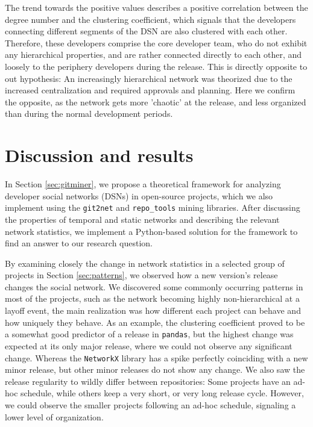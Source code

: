 The trend towards the positive values describes a positive correlation between the degree number and the clustering coefficient, which signals that the developers connecting different segments of the DSN are also clustered with each other. Therefore, these developers comprise the core developer team, who do not exhibit any hierarchical properties, and are rather connected directly to each other, and loosely to the periphery developers during the release. This is directly opposite to out hypothesis: An increasingly hierarchical network was theorized due to the increased centralization and required approvals and planning. Here we confirm the opposite, as the network gets more 'chaotic' at the release, and less organized than during the normal development periods.

\section{Discussion and results}

In Section \ref{sec:gitminer}, we propose a theoretical framework for analyzing developer social networks (DSNs) in open-source projects, which we also implement using the \texttt{git2net} and \texttt{repo\_tools} mining libraries. After discussing the properties of temporal and static networks and describing the relevant network statistics, we implement a Python-based solution for the framework to find an answer to our research question.

By examining closely the change in network statistics in a selected group of projects in Section \ref{sec:patterns}, we observed how a new version's release changes the social network. We  discovered some commonly occurring patterns in most of the projects, such as the network becoming highly non-hierarchical at a layoff event, the main realization was how different each project can behave and how uniquely they behave. As an example, the clustering coefficient proved to be a somewhat good predictor of a release in \texttt{pandas}, but the highest change was expected at its only major release, where we could not observe any significant change. Whereas the \texttt{NetworkX} library has a spike perfectly coinciding with a new minor release, but other minor releases do not show any change. We also saw the release regularity to wildly differ between repositories: Some projects have an ad-hoc schedule, while others keep a very short, or very long release cycle. However, we could observe the smaller projects following an ad-hoc schedule, signaling a lower level of organization.

